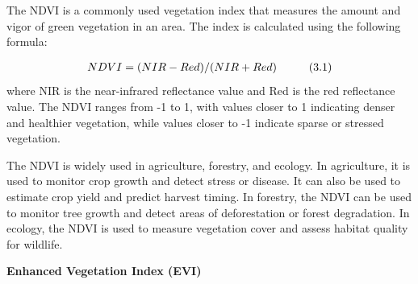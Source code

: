 \documentclass{article}
\begin{document}
{                \hspace{0.5cm}The NDVI is a commonly used vegetation index that measures the amount and vigor of green vegetation in an area. The index is calculated using the following formula:\par
                \begin{align*}
                    NDVI = (NIR - Red) / (NIR + Red) \text{\hspace{1cm}(3.1)} 
                \end{align*}
                \vspace*{1\baselineskip}
                where NIR is the near-infrared reflectance value and Red is the red reflectance value. The NDVI ranges from -1 to 1, with values closer to 1 indicating denser and healthier vegetation, while values closer to -1 indicate sparse or stressed vegetation.\par
                The NDVI is widely used in agriculture, forestry, and ecology. In agriculture, it is used to monitor crop growth and detect stress or disease. It can also be used to estimate crop yield and predict harvest timing. In forestry, the NDVI can be used to monitor tree growth and detect areas of deforestation or forest degradation. In ecology, the NDVI is used to measure vegetation cover and assess habitat quality for wildlife.\par
                \vspace*{1\baselineskip}  
                
                \textbf{Enhanced Vegetation Index (EVI)}
                \vspace*{1\baselineskip}  
                
}
\end{document}
